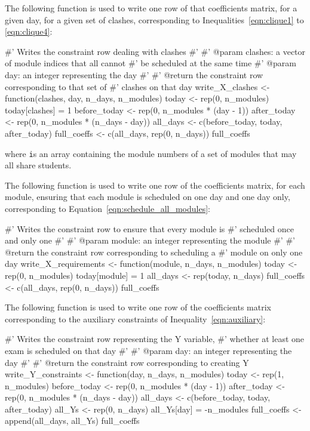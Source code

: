 The following function is used to write one row of that coefficients matrix, for
a given day, for a given set of clashes, corresponding to
Inequalities~\ref{eqn:clique1} to \ref{eqn:clique4}:

\begin{Rin-no-test}
#' Writes the constraint row dealing with clashes
#'
#' @param clashes: a vector of module indices that all cannot
#'                 be scheduled at the same time
#' @param day: an integer representing the day
#'
#' @return the constraint row corresponding to that set of
#'         clashes on that day
write_X_clashes <- function(clashes, day, n_days, n_modules){
  today <- rep(0, n_modules)
  today[clashes] = 1
  before_today <- rep(0, n_modules * (day - 1))
  after_today <- rep(0, n_modules * (n_days - day))
  all_days <- c(before_today, today, after_today)
  full_coeffs <- c(all_days, rep(0, n_days))
  full_coeffs
}
\end{Rin-no-test}

where \texttt is an array containing the module numbers of a set of
modules that may all share students.

The following function is used to write one row of the coefficients matrix, for
each module, ensuring that each module is scheduled on one day and one day only,
corresponding to Equation~\ref{eqn:schedule_all_modules}:

\begin{Rin-no-test}
#' Writes the constraint row to ensure that every module is
#' scheduled once and only one
#'
#' @param module: an integer representing the module
#'
#' @return the constraint row corresponding to scheduling a
#'         module on only one day
write_X_requirements <- function(module, n_days, n_modules){
  today <- rep(0, n_modules)
  today[module] = 1
  all_days <- rep(today, n_days)
  full_coeffs <- c(all_days, rep(0, n_days))
  full_coeffs
}
\end{Rin-no-test}

The following function is used to write one row of the coefficients matrix
corresponding to the auxiliary constraints of Inequality~\ref{eqn:auxiliary}:

\begin{Rin-no-test}
#' Writes the constraint row representing the Y variable,
#' whether at least one exam is scheduled on that day
#'
#' @param day: an integer representing the day
#'
#' @return the constraint row corresponding to creating Y
write_Y_constraints <- function(day, n_days, n_modules){
  today <- rep(1, n_modules)
  before_today <- rep(0, n_modules * (day - 1))
  after_today <- rep(0, n_modules * (n_days - day))
  all_days <- c(before_today, today, after_today)
  all_Ys <- rep(0, n_days)
  all_Ys[day] = -n_modules
  full_coeffs <- append(all_days, all_Ys)
  full_coeffs
}
\end{Rin-no-test}

